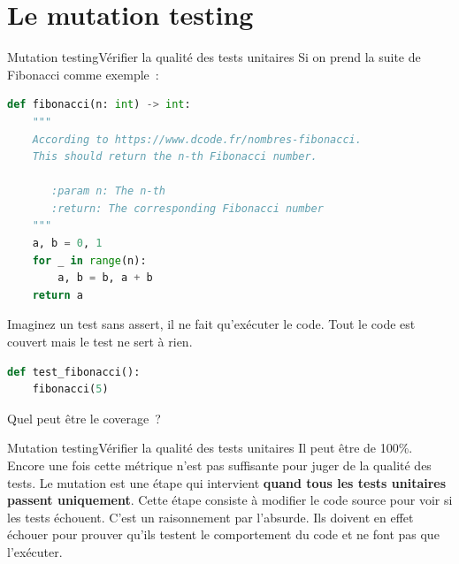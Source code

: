 \documentclass{beamer}
\begin{document}
    \section{Le mutation testing}\label{sec:mutation-testing}

    \begin{frame}[fragile]{Mutation testing}{Vérifier la qualité des tests unitaires}
        \transdissolve
        Si on prend la suite de Fibonacci comme exemple~:
        \begin{lstlisting}[language=Python,basicstyle=\ttfamily\tiny]
def fibonacci(n: int) -> int:
    """
    According to https://www.dcode.fr/nombres-fibonacci.
    This should return the n-th Fibonacci number.

       :param n: The n-th
       :return: The corresponding Fibonacci number
    """
    a, b = 0, 1
    for _ in range(n):
        a, b = b, a + b
    return a
        \end{lstlisting}
        Imaginez un test sans assert, il ne fait qu'exécuter le code.
        Tout le code est couvert mais le test ne sert à rien.
        \begin{lstlisting}[language=Python]
def test_fibonacci():
    fibonacci(5)
        \end{lstlisting}
        Quel peut être le coverage~?
    \end{frame}

    \begin{frame}[fragile]{Mutation testing}{Vérifier la qualité des tests unitaires}
        Il peut être de 100\%.
        Encore une fois cette métrique n'est pas suffisante pour juger de la qualité des tests.
        \bigbreak
        Le mutation est une étape qui intervient \textbf{quand tous les tests unitaires passent uniquement}.
        Cette étape consiste à modifier le code source pour voir si les tests échouent.
        C'est un raisonnement par l'absurde.
        Ils doivent en effet échouer pour prouver qu'ils testent le comportement du code et ne font pas que l'exécuter.
    \end{frame}
\end{document}
